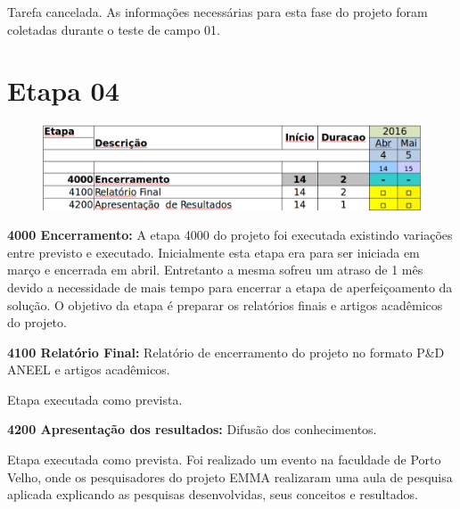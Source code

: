 Tarefa cancelada. As informações necessárias para esta fase do
projeto foram coletadas durante o teste de campo 01. 

\section{Etapa 04} 

\begin{figure}[H]
\centering
\includegraphics[width=0.9\columnwidth]{figs/etapa4}
\end{figure} 

\noindent
\textbf{4000 Encerramento:} A etapa 4000 do projeto foi executada existindo
variações entre previsto e executado. Inicialmente esta etapa era para ser
iniciada em março e encerrada em abril. Entretanto a mesma sofreu um atraso de 1
mês devido a necessidade de mais tempo para encerrar a etapa de aperfeiçoamento
da solução. O objetivo da etapa é preparar os relatórios finais e artigos acadêmicos do projeto.

\noindent
\textbf{4100 Relatório Final:} Relatório de encerramento do projeto no formato
P\&D ANEEL e artigos acadêmicos.

Etapa executada como prevista. 

\noindent
\textbf{4200 Apresentação dos resultados:} Difusão dos conhecimentos.

Etapa executada como prevista. Foi realizado um evento na faculdade de Porto
Velho, onde os pesquisadores do projeto EMMA realizaram uma aula de pesquisa
aplicada explicando as pesquisas desenvolvidas, seus conceitos e resultados.
 